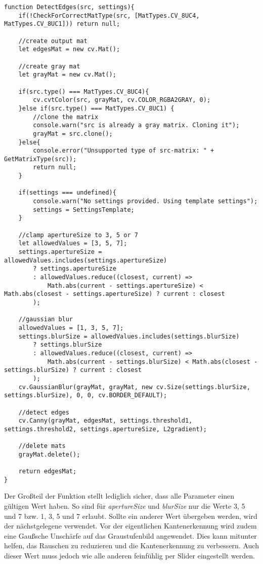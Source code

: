 \begin{lstlisting}[style=JavaScript]
function DetectEdges(src, settings){
    if(!CheckForCorrectMatType(src, [MatTypes.CV_8UC4, MatTypes.CV_8UC1])) return null;

    //create output mat
    let edgesMat = new cv.Mat();

    //create gray mat
    let grayMat = new cv.Mat();

    if(src.type() === MatTypes.CV_8UC4){
        cv.cvtColor(src, grayMat, cv.COLOR_RGBA2GRAY, 0);
    }else if(src.type() === MatTypes.CV_8UC1) {
        //clone the matrix
        console.warn("src is already a gray matrix. Cloning it");
        grayMat = src.clone();
    }else{
        console.error("Unsupported type of src-matrix: " + GetMatrixType(src));
        return null;
    }

    if(settings === undefined){
        console.warn("No settings provided. Using template settings");
        settings = SettingsTemplate;
    }

    //clamp apertureSize to 3, 5 or 7
    let allowedValues = [3, 5, 7];
    settings.apertureSize = allowedValues.includes(settings.apertureSize)
        ? settings.apertureSize
        : allowedValues.reduce((closest, current) =>
            Math.abs(current - settings.apertureSize) < Math.abs(closest - settings.apertureSize) ? current : closest
        );

    //gaussian blur
    allowedValues = [1, 3, 5, 7];
    settings.blurSize = allowedValues.includes(settings.blurSize)
        ? settings.blurSize
        : allowedValues.reduce((closest, current) =>
            Math.abs(current - settings.blurSize) < Math.abs(closest - settings.blurSize) ? current : closest
        );
    cv.GaussianBlur(grayMat, grayMat, new cv.Size(settings.blurSize, settings.blurSize), 0, 0, cv.BORDER_DEFAULT);

    //detect edges
    cv.Canny(grayMat, edgesMat, settings.threshold1, settings.threshold2, settings.apertureSize, L2gradient);

    //delete mats
    grayMat.delete();

    return edgesMat;
}
\end{lstlisting}

Der Großteil der Funktion stellt lediglich sicher, dass alle Parameter einen gültigen Wert haben. So sind für \textit{apertureSize} und \textit{blurSize} nur die Werte 3, 5 und 7 bzw. 1, 3, 5 und 7 erlaubt. Sollte ein anderer Wert übergeben werden, wird der nächstgelegene verwendet. Vor der eigentlichen Kantenerkennung wird zudem eine Gaußsche Unschärfe auf das Graustufenbild angewendet. Dies kann mitunter helfen, das Rauschen zu reduzieren und die Kantenerkennung zu verbessern. Auch dieser Wert muss jedoch wie alle anderen feinfühlig per Slider eingestellt werden.

